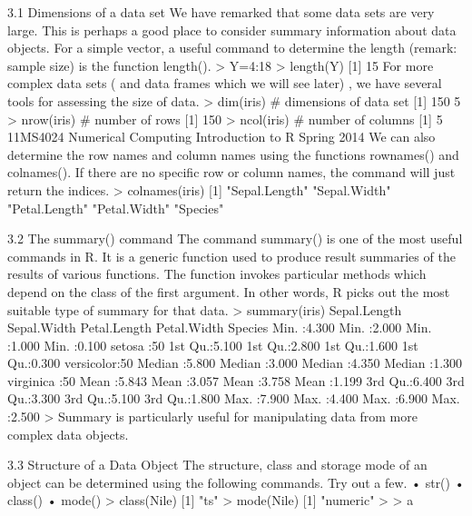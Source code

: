 \documentclass{beamer}
\begin{document}
\begin{frame}

3.1 Dimensions of a data set
We have remarked that some data sets are very large. This is perhaps a good place to consider
summary information about data objects. For a simple vector, a useful command to determine
the length (remark: sample size) is the function length().
> Y=4:18
> length(Y)
[1] 15
For more complex data sets ( and data frames which we will see later) , we have several
tools for assessing the size of data.
> dim(iris) # dimensions of data set
[1] 150 5
> nrow(iris) # number of rows
[1] 150
> ncol(iris) # number of columns
[1] 5
11MS4024 Numerical Computing Introduction to R Spring 2014
We can also determine the row names and column names using the functions rownames()
and colnames(). If there are no specific row or column names, the command will just return
the indices.
> colnames(iris)
[1] "Sepal.Length" "Sepal.Width" "Petal.Length" "Petal.Width" "Species"

\end{frame}
\begin{frame}
3.2 The summary() command
The command summary() is one of the most useful commands in R. It is a generic function used
to produce result summaries of the results of various functions. The function invokes particular
methods which depend on the class of the first argument. In other words, R picks out the most
suitable type of summary for that data.
> summary(iris)
Sepal.Length Sepal.Width Petal.Length Petal.Width Species
Min. :4.300 Min. :2.000 Min. :1.000 Min. :0.100 setosa :50
1st Qu.:5.100 1st Qu.:2.800 1st Qu.:1.600 1st Qu.:0.300 versicolor:50
Median :5.800 Median :3.000 Median :4.350 Median :1.300 virginica :50
Mean :5.843 Mean :3.057 Mean :3.758 Mean :1.199
3rd Qu.:6.400 3rd Qu.:3.300 3rd Qu.:5.100 3rd Qu.:1.800
Max. :7.900 Max. :4.400 Max. :6.900 Max. :2.500
>
Summary is particularly useful for manipulating data from more complex data objects.
\end{frame}
\begin{frame}

3.3 Structure of a Data Object
The structure, class and storage mode of an object can be determined using the following
commands. Try out a few.
• str()
• class()
• mode()
> class(Nile)
[1] "ts"
> mode(Nile)
[1] "numeric"
>
> a
\end{frame}
\end{document}
